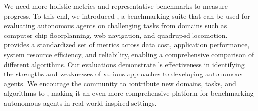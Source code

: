 \noindent 
We need more holistic metrics and representative benchmarks to measure progress. To this end, we introduced \method, a benchmarking suite that can be used for evaluating autonomous agents on challenging tasks from domains such as computer chip floorplanning, web navigation, and quadruped locomotion. \method provides a standardized set of metrics across data cost, application performance, system resource efficiency, and reliability, enabling a comprehensive comparison of different algorithms.
Our evaluations demonstrate \method's effectiveness in identifying the strengths and weaknesses of various approaches to developing autonomous agents.
We encourage the community to contribute new domains, tasks, and algorithms to \method, making it an even more comprehensive platform for benchmarking autonomous agents in real-world-inspired settings.
